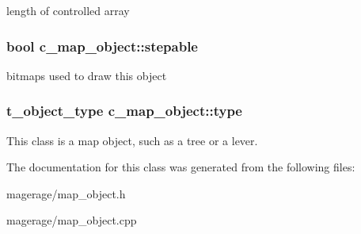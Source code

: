 length of controlled array \hypertarget{classc__map__object_a89b2a794cb8409e93493a99adfe2d311}{
\subsubsection[{stepable}]{\setlength{\rightskip}{0pt plus 5cm}bool c\-\_\-map\-\_\-object\-::stepable\hspace{0.3cm}{\ttfamily [protected]}}}\label{classc__map__object_a89b2a794cb8409e93493a99adfe2d311}
bitmaps used to draw this object \hypertarget{classc__map__object_a9d47ec81d25e5785311adc675ea6377d}{
\subsubsection[{type}]{\setlength{\rightskip}{0pt plus 5cm}t\-\_\-object\-\_\-type c\-\_\-map\-\_\-object\-::type\hspace{0.3cm}{\ttfamily [protected]}}}\label{classc__map__object_a9d47ec81d25e5785311adc675ea6377d}
This class is a map object, such as a tree or a lever. 

The documentation for this class was generated from the following files\-:\begin{DoxyCompactItemize}
\item 
magerage/map\-\_\-object.\-h\item 
magerage/map\-\_\-object.\-cpp\end{DoxyCompactItemize}
